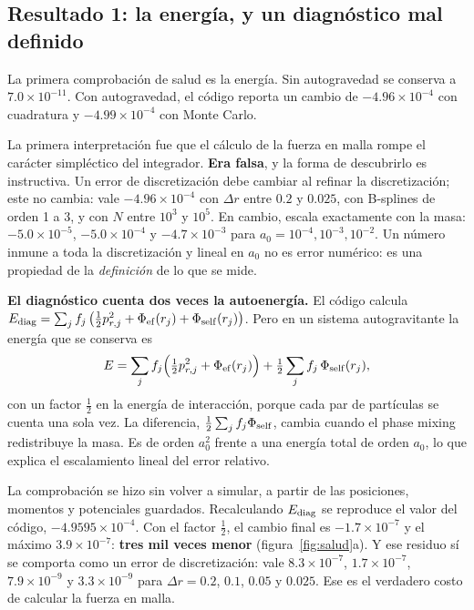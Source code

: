 \documentclass[11pt,a4paper]{article}
\theoremstyle{definition}
\begin{document}
\subsection{Resultado 1: la energía, y un diagnóstico mal definido}

La primera comprobación de salud es la energía. Sin autogravedad se conserva a
$7.0\times10^{-11}$. Con autogravedad, el código reporta un cambio de
$-4.96\times10^{-4}$ con cuadratura y $-4.99\times10^{-4}$ con Monte Carlo.

La primera interpretación fue que el cálculo de la fuerza en malla rompe el
carácter simpléctico del integrador. \textbf{Era falsa}, y la forma de descubrirlo
es instructiva. Un error de discretización debe cambiar al refinar la
discretización; este no cambia: vale $-4.96\times10^{-4}$ con $\Delta r$ entre
$0.2$ y $0.025$, con B-splines de orden 1 a 3, y con $N$ entre $10^3$ y $10^5$. En
cambio, escala exactamente con la masa: $-5.0\times10^{-5}$, $-5.0\times10^{-4}$ y
$-4.7\times10^{-3}$ para $a_0=10^{-4},10^{-3},10^{-2}$. Un número inmune a toda la
discretización y lineal en $a_0$ no es error numérico: es una propiedad de la
\emph{definición} de lo que se mide.

\begin{idea}
\textbf{El diagnóstico cuenta dos veces la autoenergía.} El código calcula
$E_{\rm diag}=\sum_j f_j\,\big(\tfrac12 p_{r,j}^2+\Phi_{\rm ef}(r_j)+\Phi_{\rm
self}(r_j)\big)$. Pero en un sistema autogravitante la energía que se conserva es
\begin{equation}
  E = \sum_j f_j\Big(\tfrac12 p_{r,j}^2 + \Phi_{\rm ef}(r_j)\Big)
      + \tfrac12\sum_j f_j\,\Phi_{\rm self}(r_j) ,
\end{equation}
con un factor $\tfrac12$ en la energía de interacción, porque cada par de partículas
se cuenta una sola vez. La diferencia, $\tfrac12\sum_j f_j\Phi_{\rm self}$, cambia
cuando el phase mixing redistribuye la masa. Es de orden $a_0^2$ frente a una
energía total de orden $a_0$, lo que explica el escalamiento lineal del error
relativo.
\end{idea}

La comprobación se hizo sin volver a simular, a partir de las posiciones, momentos y
potenciales guardados. Recalculando $E_{\rm diag}$ se reproduce el valor del código,
$-4.9595\times10^{-4}$. Con el factor $\tfrac12$, el cambio final es
$-1.7\times10^{-7}$ y el máximo $3.9\times10^{-7}$: \textbf{tres mil veces menor}
(figura~\ref{fig:salud}a). Y ese residuo sí se comporta como un error de
discretización: vale $8.3\times10^{-7}$, $1.7\times10^{-7}$, $7.9\times10^{-9}$ y
$3.3\times10^{-9}$ para $\Delta r=0.2$, $0.1$, $0.05$ y $0.025$. Ese es el verdadero
costo de calcular la fuerza en malla.
\end{document}
